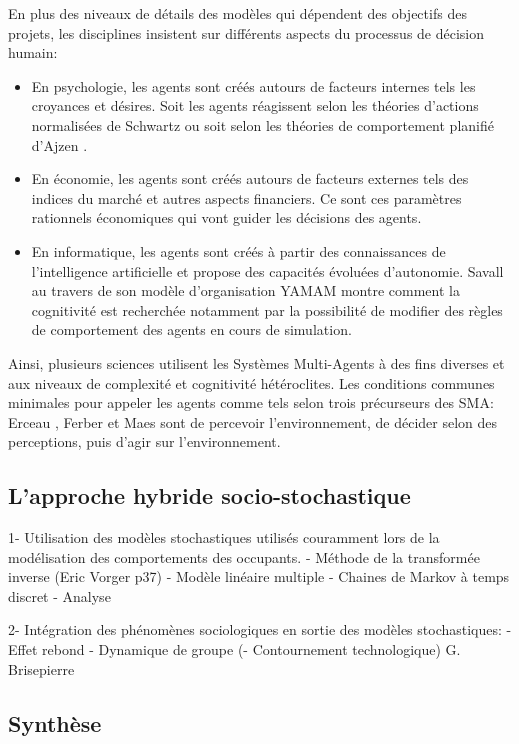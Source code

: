 En plus des niveaux de détails des modèles qui dépendent des objectifs des projets, les disciplines insistent sur différents aspects du processus de décision humain:
\begin{itemize}
\renewcommand{\arraystretch}{0}
\item En psychologie, les agents sont créés autours de facteurs internes tels les croyances et désires. Soit les agents réagissent selon les théories d'actions normalisées de Schwartz \cite{Schwartz-77} ou soit selon les théories de comportement planifié d'Ajzen \cite{Ajzen-91}.
\item En économie, les agents sont créés autours de facteurs externes tels des indices du marché et autres aspects financiers. Ce sont ces paramètres rationnels économiques qui vont guider les décisions des agents.
\item En informatique, les agents sont créés à partir des connaissances de l'intelligence artificielle et propose des capacités évoluées d'autonomie. Savall \cite{Savall-03} au travers de son modèle d'organisation YAMAM montre comment la cognitivité est recherchée notamment par la possibilité de modifier des règles de comportement des agents en cours de simulation.
\end{itemize}
Ainsi, plusieurs sciences utilisent les Systèmes Multi-Agents à des fins diverses et aux niveaux de complexité et cognitivité hétéroclites. Les conditions communes minimales pour appeler les agents comme tels selon trois précurseurs des SMA: Erceau \cite{Erceau-93}, Ferber \cite{Ferber-95} et Maes \cite{Maes-95} sont de percevoir l'environnement, de décider selon des perceptions, puis d'agir sur l'environnement. 

\subsection{L'approche hybride socio-stochastique}

1- Utilisation des modèles stochastiques utilisés couramment lors de la modélisation des comportements des occupants.
- Méthode de la transformée inverse (Eric Vorger p37)
- Modèle linéaire multiple
- Chaines de Markov à temps discret 
- Analyse 

2- Intégration des phénomènes sociologiques en sortie des modèles stochastiques:
- Effet rebond
- Dynamique de groupe 
(- Contournement technologique) G. Brisepierre

\subsection{Synthèse}



